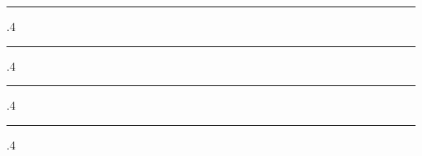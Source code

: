 \documentclass[10pt]{article}
\makeatletter
\newcommand*\rulefill[1][.4\p@]{%
    \leavevmode
    \leaders \hrule \@height #1\relax \hfill
    \null
  }
\makeatother
\begin{document}

\begin{minipage}[t]{123mm}
\noindent
	\textcolor{black!20}{\rulefill\quad 
			{\fontsize{14}{20}\selectfont \textsl{}}
	\quad\rulefill}
\end{minipage}
\hspace{5mm}
\begin{minipage}[t]{62mm}
\noindent
	\textcolor{black!20}{\rulefill\quad 
			{\fontsize{14}{25}\selectfont \textsl{}}
	\quad\rulefill}
\flushleft
\end{minipage}

\vspace{2mm}
\end{document}
